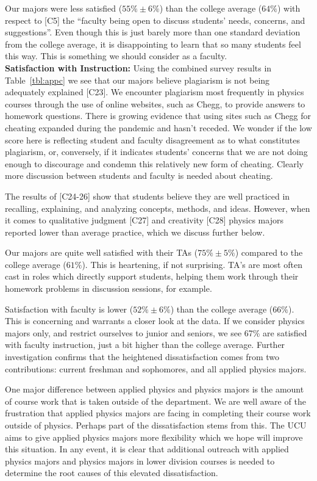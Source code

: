 \documentclass[12pt]{article}
\begin{document}
Our majors were less satisfied ($55\%\pm6\%$) than the college average
($64\%$) with respect to [C5] the ``faculty being open to discuss
students' needs, concerns, and suggestions''.  Even though this is
just barely more than one standard deviation from the college average,
it is disappointing to learn that so many students feel this way.
This is something we should consider as a faculty.\\[3pt]

\noindent
{\bf Satisfaction with Instruction:} Using the combined survey results
in Table~\ref{tbl:appc} we see that our majors believe plagiarism is
not being adequately explained [C23].  We encounter plagiarism most
frequently in physics courses through the use of online websites, such
as Chegg, to provide answers to homework questions.  There is growing
evidence that using sites such as Chegg for cheating expanded during
the pandemic and hasn't receded.  We wonder if the low score here is
reflecting student and faculty disagreement as to what constitutes
plagiarism, or, conversely, if it indicates students' concerns that we
are not doing enough to discourage and condemn this relatively new
form of cheating.  Clearly more discussion between students and
faculty is needed about cheating.

The results of [C24-26] show that students believe they are well
practiced in recalling, explaining, and analyzing concepts, methods,
and ideas.  However, when it comes to qualitative judgment [C27] and
creativity [C28] physics majors reported lower than average practice,
which we discuss further below.

Our majors are quite well satisfied with their TAs ($75\% \pm 5\%$)
compared to the college average ($61\%$).  This is heartening, if not
surprising.  TA's are most often cast in roles which directly support
students, helping them work through their homework problems in
discussion sessions, for example.

Satisfaction with faculty is lower ($52\% \pm 6\%$) than the college
average ($66\%$).  This is concerning and warrants a closer look at
the data.  If we consider physics majors only, and restrict ourselves
to junior and seniors, we see 67\% are satisfied with faculty
instruction, just a bit higher than the college average.  Further
investigation confirms that the heightened dissatisfaction comes from
two contributions: current freshman and sophomores, and all applied
physics majors.

One major difference between applied physics and physics majors is the
amount of course work that is taken outside of the department. We are
well aware of the frustration that applied physics majors are facing
in completing their course work outside of physics.  Perhaps part of
the dissatisfaction stems from this.  The UCU aims to give applied
physics majors more flexibility which we hope will improve this
situation.  In any event, it is clear that additional outreach with
applied physics majors and physics majors in lower division courses is
needed to determine the root causes of this elevated
dissatisfaction.\\[3pt]
\end{document}
